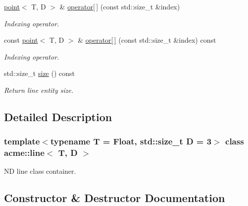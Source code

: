 \begin{DoxyCompactItemize}
\hyperlink{classacme_1_1point}{point}$<$ T, D $>$ \& \hyperlink{classacme_1_1line_a1db4409de6ae4339a8becc64aa9c9523}{operator\mbox{[}$\,$\mbox{]}} (const std\+::size\+\_\+t \&index)
\begin{DoxyCompactList}\small\item\em Indexing operator. \end{DoxyCompactList}\item 
const \hyperlink{classacme_1_1point}{point}$<$ T, D $>$ \& \hyperlink{classacme_1_1line_a8de20bf04835db679b40e1e57bfb93ad}{operator\mbox{[}$\,$\mbox{]}} (const std\+::size\+\_\+t \&index) const
\begin{DoxyCompactList}\small\item\em Indexing operator. \end{DoxyCompactList}\item 
\mbox{\label{classacme_1_1line_ade0b6a13e2d8564bff41dc2af83e3445}} 
std\+::size\+\_\+t \hyperlink{classacme_1_1line_ade0b6a13e2d8564bff41dc2af83e3445}{size} () const
\begin{DoxyCompactList}\small\item\em Return line entity size. \end{DoxyCompactList}\end{DoxyCompactItemize}


\subsection{Detailed Description}
\subsubsection*{template$<$typename T = Float, std\+::size\+\_\+t D = 3$>$\newline
class acme\+::line$<$ T, D $>$}

ND line class container. 

\subsection{Constructor \& Destructor Documentation}
\mbox{\label{classacme_1_1line_a74c5376f08b0aad5010739a790972abc}} 

